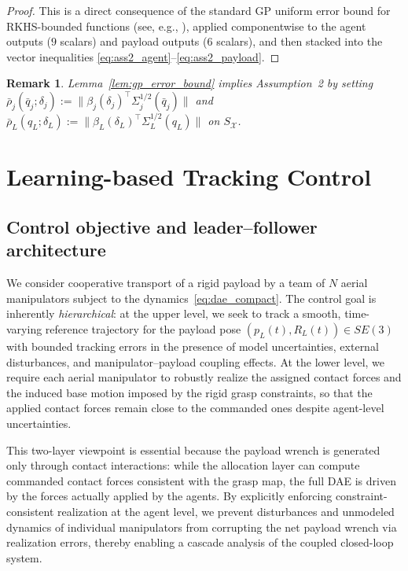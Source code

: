 \documentclass[letterpaper, 10 pt, conference]{ieeeconf}  %
\newcommand{\0}{\matr{0}}
\newtheorem{remark}{Remark}
\begin{document}
\begin{proof}
This is a direct consequence of the standard GP uniform error bound for RKHS-bounded functions
(see, e.g., \cite[Thm.~6]{Srinivas2012}), applied componentwise to the agent outputs ($9$ scalars)
and payload outputs ($6$ scalars), and then stacked into the vector inequalities 
\eqref{eq:ass2_agent}--\eqref{eq:ass2_payload}.
\end{proof}

\begin{remark}
Lemma~\ref{lem:gp_error_bound} implies Assumption~2 by setting
$\bar\rho_j(\bar q_j;\delta_j):=\|\beta_j(\delta_j)^\top \Sigma_j^{1/2}(\bar q_j)\|$ and
$\bar\rho_L(q_L;\delta_L):=\|\beta_L(\delta_L)^\top \Sigma_L^{1/2}(q_L)\|$ on $S_{\mathcal X}$.
\end{remark}

\section{Learning-based Tracking Control} \label{sec:tracking}
\subsection{Control objective and leader--follower architecture}
\label{subsec:tracking_objective}

We consider cooperative transport of a rigid payload by a team of $N$ aerial manipulators subject to the dynamics~\eqref{eq:dae_compact}. The control goal is inherently \emph{hierarchical}: at the upper level, we seek to track a smooth, time-varying reference trajectory for the payload pose $(p_L(t),R_L(t))\in SE(3)$ with bounded tracking errors in the presence of model uncertainties, external disturbances, and manipulator--payload coupling effects. At the lower level, we require each aerial manipulator to robustly realize the assigned contact forces and the induced base motion imposed by the rigid grasp constraints, so that the applied contact forces remain close to the commanded ones despite agent-level uncertainties.

This two-layer viewpoint is essential because the payload wrench is generated only through contact interactions: while the allocation layer can compute commanded contact forces consistent with the grasp map, the full DAE is driven by the forces actually applied by the agents. By explicitly enforcing constraint-consistent realization at the agent level, we prevent disturbances and unmodeled dynamics of individual manipulators from corrupting the net payload wrench via realization errors, thereby enabling a cascade analysis of the coupled closed-loop system.
\end{document}
